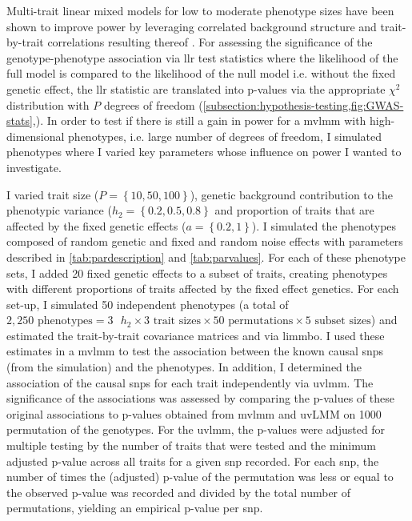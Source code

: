 Multi-trait linear mixed models for low to moderate phenotype sizes have been shown to improve power by leveraging correlated background structure and trait-by-trait correlations resulting thereof \citep{Casale2015}. For assessing the significance of the genotype-phenotype association via \gls{llr} test statistics where the likelihood of the full model is compared to the likelihood of the null model i.e. without the fixed genetic effect, the \gls{llr} statistic are translated into p-values via the appropriate \(\chi^2\) distribution with \(P\) degrees of freedom (\cref{subsection:hypothesis-testing,fig:GWAS-stats},\citep{Wilks1938}).  In order to test if there is still a gain in power for a \gls{mvlmm} with high-dimensional phenotypes, i.e. large number of degrees of freedom, I simulated phenotypes where I varied key parameters whose influence on power I wanted to investigate. 

I varied trait size (\(P=\left\{10,50,100\right\}\)), genetic background contribution to the phenotypic variance (\(h_2=\left\{0.2,0.5,0.8\right\}\) and proportion of traits that are affected by the fixed genetic effects (\(a=\left\{0.2, 1\right\}\)). I simulated the phenotypes composed of random genetic and fixed and random noise effects with parameters described in \cref{tab:pardescription} and \cref{tab:parvalues}. For each of these phenotype sets, I added \num{20} fixed genetic effects to a subset of traits, creating phenotypes with different proportions of traits affected by the fixed effect genetics.  For each set-up, I simulated \num{50} independent phenotypes (a total of \( 2,250 \text{ phenotypes} = 3\text{ }h_2 \times 3 \text{ trait sizes} \times 50 \text{ permutations} \times 5 \text{ subset sizes}\)) and estimated the trait-by-trait covariance matrices  and  via \gls{limmbo}. I used these estimates in a \gls{mvlmm} to test the association between the known causal \glspl{snp} (from the simulation) and the phenotypes. In addition, I determined the association of the causal \glspl{snp} for each trait independently via \gls{uvlmm}. The significance of the associations was assessed by comparing the p-values of these original associations to p-values obtained from \gls{mvlmm} and uvLMM on \num{1000} permutation of the genotypes.  For the \gls{uvlmm}, the p-values were adjusted for multiple testing by the number of traits that were tested and the minimum adjusted p-value across all traits for a given \gls{snp} recorded. For each \gls{snp}, the number of times the (adjusted) p-value of the permutation was less or equal to the observed p-value was recorded and divided by the total number of permutations, yielding an empirical p-value per \gls{snp}.

